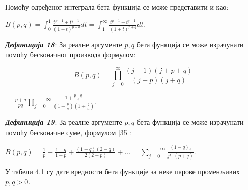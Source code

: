 Помоћу одређеног интеграла бета функција се може представити и као:

\(B(p,q) = \int_{0}^{1}\frac{t^{p - 1} + t^{q - 1}}{{(1 + t)}^{p + q}}dt = \int_{1}^{\infty}\frac{t^{p - 1} + t^{q - 1}}{{(1 + t)}^{p + q}}dt\).

\emph{\textbf{Дефиниција 18}}: За реалне аргументе \(p,q\) бета функција
се може израчунати помоћу бесконачног производа формулом:

\[B(p,q) = \overset{\infty}{\prod_{j = 0}}\frac{(j + 1)(j + p + q)}{(j + p)(j + q)}\]

\(= \frac{p + q}{pq}\overset{\infty}{\prod_{j = 0}}\frac{1 + \frac{p + q}{j}}{(1 + \frac{p}{n})(1 + \frac{q}{n})}\).

\emph{\textbf{Дефиниција 19}}: За реалне аргументе \(p,q\) бета функција
се може израчунати помоћу бесконачне суме, формулом {[}35{]}:

\(B(p,q) = \frac{1}{p} + \frac{1 - q}{1 + p} + \frac{(1 - q)(2 - q)}{2(2 + p)} + ... = \overset{\infty}{\sum_{j = 0}}\frac{{(1 - q)}_{j}}{j! \cdot (p + j)}\).

У табели 4.1 су дате вредности бета функције за неке парове променљивих
\(p,q > 0\).

